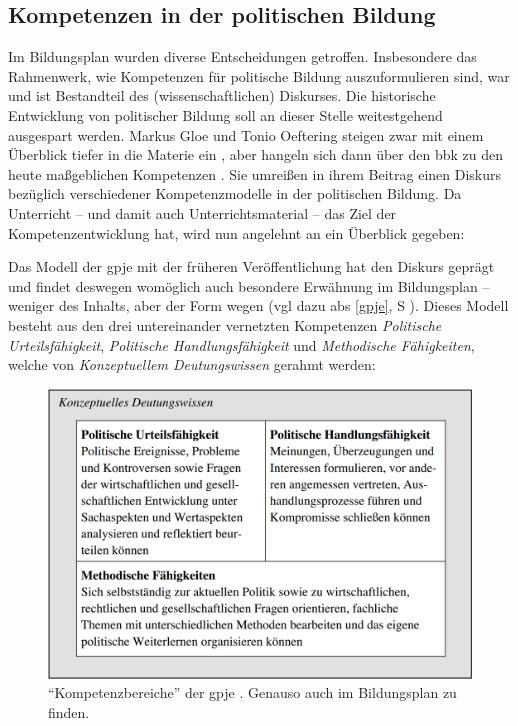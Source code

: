 \subsection{Kompetenzen in der politischen Bildung}
Im Bildungsplan wurden diverse Entscheidungen getroffen. Insbesondere das Rahmenwerk, wie Kompetenzen für politische Bildung auszuformulieren sind, war und ist Bestandteil des (wissenschaftlichen) Diskurses. Die historische Entwicklung von politischer Bildung soll an dieser Stelle weitestgehend ausgespart werden. 
Markus Gloe und Tonio Oeftering steigen zwar mit einem Überblick tiefer in die Materie ein \autocite[95-100]{Gloe2020}, aber hangeln sich dann über den \gls{bbk} \autocite[101-103; in dieser Arbeit \gls{s} \gls{abs} \ref{bbk}: \gls{S} \pageref{bbk}]{Gloe2020} zu den heute maßgeblichen Kompetenzen \autocite[104-114]{Gloe2020}. Sie umreißen in ihrem Beitrag einen Diskurs bezüglich verschiedener Kompetenzmodelle in der politischen Bildung. Da Unterricht -- und damit auch Unterrichtsmaterial -- das Ziel der Kompetenzentwicklung hat, wird nun angelehnt an \citeauthor{Gloe2020} ein Überblick gegeben:

Das Modell der \gls{gpje} mit der früheren Veröffentlichung \citeyear{gpje2004} hat den Diskurs geprägt und findet deswegen womöglich auch besondere Erwähnung im Bildungsplan -- weniger des Inhalts, aber der Form wegen (\gls{vgl} dazu \gls{abs} \ref{gpje}, \gls{S} \pageref{gpje}).
Dieses Modell besteht aus den drei untereinander vernetzten Kompetenzen \emph{Politische Urteilsfähigkeit}, \emph{Politische Handlungsfähigkeit} und \emph{Methodische Fähigkeiten}, welche von \emph{Konzeptuellem Deutungswissen} gerahmt werden:
\begin{figure}[H]
    \centering
    \includegraphics[width=1\linewidth]{gpje 2004 Kompetenzmodell S. 13.png}
    \caption{\enquote{Kompetenzbereiche} der \gls{gpje} \autocite[13]{gpje2004}. Genauso auch im Bildungsplan \autocite[10]{bplan} zu finden.}
    \label{gpjeKompetenzmodell}
\end{figure}

